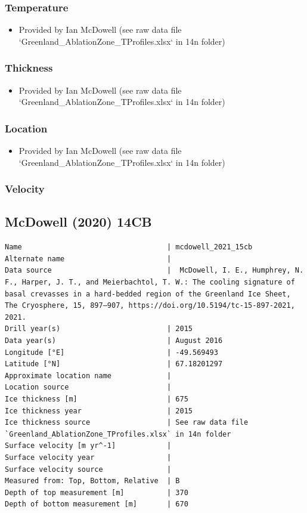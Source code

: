 \documentclass[article,a4paper,times,11pt,twoside]{article}
\begin{document}
\subsubsection{Temperature}
\label{sec:org5786bdd}

\begin{itemize}
\item Provided by Ian McDowell (see raw data file `Greenland\_AblationZone\_TProfiles.xlsx` in 14n folder)
\end{itemize}

\subsubsection{Thickness}
\label{sec:orgfc1862f}

\begin{itemize}
\item Provided by Ian McDowell (see raw data file `Greenland\_AblationZone\_TProfiles.xlsx` in 14n folder)
\end{itemize}

\subsubsection{Location}
\label{sec:orgc1c8765}

\begin{itemize}
\item Provided by Ian McDowell (see raw data file `Greenland\_AblationZone\_TProfiles.xlsx` in 14n folder)
\end{itemize}

\subsubsection{Velocity}
\label{sec:org73946f8}
\clearpage
\subsection{McDowell (2020) 14CB}
\label{sec:org88d7a3c}
\begin{verbatim}
Name                                  | mcdowell_2021_15cb
Alternate name                        | 
Data source                           |  McDowell, I. E., Humphrey, N. F., Harper, J. T., and Meierbachtol, T. W.: The cooling signature of basal crevasses in a hard-bedded region of the Greenland Ice Sheet, The Cryosphere, 15, 897–907, https://doi.org/10.5194/tc-15-897-2021, 2021.
Drill year(s)                         | 2015
Data year(s)                          | August 2016
Longitude [°E]                        | -49.569493
Latitude [°N]                         | 67.18201297
Approximate location name             | 
Location source                       | 
Ice thickness [m]                     | 675
Ice thickness year                    | 2015
Ice thickness source                  | See raw data file `Greenland_AblationZone_TProfiles.xlsx` in 14n folder
Surface velocity [m yr^-1]            | 
Surface velocity year                 | 
Surface velocity source               | 
Measured from: Top, Bottom, Relative  | B
Depth of top measurement [m]          | 370
Depth of bottom measurement [m]       | 670
\end{verbatim}
\end{document}
